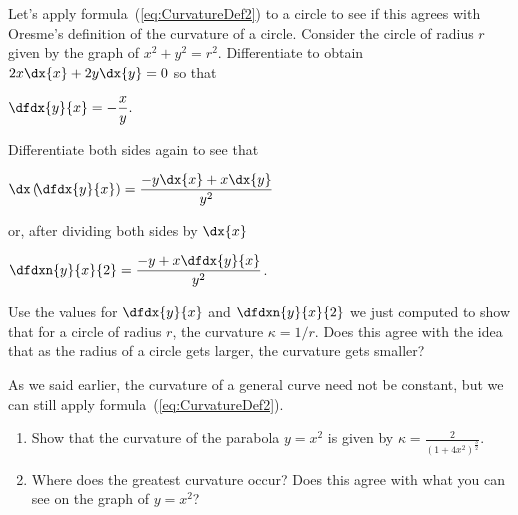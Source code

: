 \begin{myexample}
  Let's apply formula~(\ref{eq:CurvatureDef2}) to a circle to see if
  this agrees with Oresme's definition of the curvature of a circle.
  Consider the circle of radius $r$ given by the graph of
  $x^2+y^2=r^2$.
  Differentiate to obtain $  2x\dx{x}+2y\dx{y}=0$ so that \\
  \centerline{$\displaystyle \dfdx{y}{x}=-\frac{x}{y}.  $}
  Differentiate both sides again to see that\\
\centerline{$\displaystyle\dx\left(\hskip-2pt\dfdx{y}{x}\right)=\frac{-y\dx{x}+x\dx{y}}{y^2}$}
or, after dividing both sides by $\dx{x}$\\
\centerline{$\displaystyle  \dfdxn{y}{x}{2}=\frac{-y+x\dfdx{y}{x}}{y^2}$.}




\begin{ProficiencyDrill}
  Use the  values for $\dfdx{y}{x}$ and $\dfdxn{y}{x}{2}$ we
  just computed to show that for a circle of radius $r$, the
  curvature $\kappa=1/r$.
  Does this agree with the idea that as the radius of a circle
  gets larger, the curvature gets smaller?
\end{ProficiencyDrill}
\end{myexample}

As we said earlier, the curvature of a general curve need not be
constant, but we can still apply formula~(\ref{eq:CurvatureDef2}).

\begin{embeddedproblem-enumerate}
  \begin{enumerate}[label={\bf{}(\alph*)}]{}
  \item Show that the curvature of the parabola $y=x^2$ is given by
    $ \displaystyle\kappa=\frac{2}{(1+4x^2)^{\frac32}}$.
  \item Where does the greatest curvature occur? Does this agree with
    what you can see on the graph of $y=x^2$?
  \end{enumerate}
\end{embeddedproblem-enumerate}

